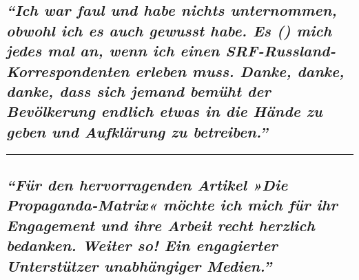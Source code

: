\hypertarget{ich-war-faul-und-habe-nichts-unternommen-obwohl-ich-es-auch-gewusst-habe-es--mich-jedes-mal-an-wenn-ich-einen-srf-russland-korrespondenten-erleben-muss-danke-danke-danke-dass-sich-jemand-bemuxfcht-der-bevuxf6lkerung-endlich-etwas-in-die-huxe4nde-zu-geben-und-aufkluxe4rung-zu-betreiben}{%
\subsection{\texorpdfstring{\emph{``Ich war faul und habe nichts
unternommen, obwohl ich es auch gewusst habe. Es () mich jedes mal an,
wenn ich einen SRF-Russland-Korrespondenten erleben muss. Danke, danke,
danke, dass sich jemand bemüht der Bevölkerung endlich etwas in die
Hände zu geben und Aufklärung zu
betreiben.''}}{``Ich war faul und habe nichts unternommen, obwohl ich es auch gewusst habe. Es () mich jedes mal an, wenn ich einen SRF-Russland-Korrespondenten erleben muss. Danke, danke, danke, dass sich jemand bemüht der Bevölkerung endlich etwas in die Hände zu geben und Aufklärung zu betreiben.''}}\label{ich-war-faul-und-habe-nichts-unternommen-obwohl-ich-es-auch-gewusst-habe-es--mich-jedes-mal-an-wenn-ich-einen-srf-russland-korrespondenten-erleben-muss-danke-danke-danke-dass-sich-jemand-bemuxfcht-der-bevuxf6lkerung-endlich-etwas-in-die-huxe4nde-zu-geben-und-aufkluxe4rung-zu-betreiben}}

\begin{center}\rule{0.5\linewidth}{\linethickness}\end{center}

\hypertarget{fuxfcr-den-hervorragenden-artikel-die-propaganda-matrix-muxf6chte-ich-mich-fuxfcr-ihr-engagement-und-ihre-arbeit-recht-herzlich-bedanken-weiter-so-ein-engagierter-unterstuxfctzer-unabhuxe4ngiger-medien}{%
\subsection{\texorpdfstring{\emph{``Für den hervorragenden Artikel »Die
Propaganda-Matrix« möchte ich mich für ihr Engagement und ihre Arbeit
recht herzlich bedanken. Weiter so! Ein engagierter Unterstützer
unabhängiger
Medien.''}}{``Für den hervorragenden Artikel »Die Propaganda-Matrix« möchte ich mich für ihr Engagement und ihre Arbeit recht herzlich bedanken. Weiter so! Ein engagierter Unterstützer unabhängiger Medien.''}}\label{fuxfcr-den-hervorragenden-artikel-die-propaganda-matrix-muxf6chte-ich-mich-fuxfcr-ihr-engagement-und-ihre-arbeit-recht-herzlich-bedanken-weiter-so-ein-engagierter-unterstuxfctzer-unabhuxe4ngiger-medien}}

